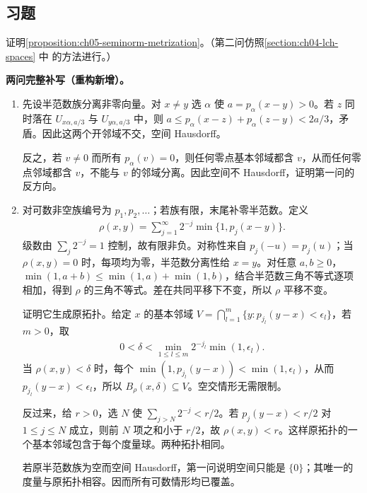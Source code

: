 \documentclass[../../main.tex]{subfiles}
\begin{document}
\subsection*{习题}
\begin{exercise}\label{exercise:ch05-prove-seminorm-metrization}
证明\cref{proposition:ch05-seminorm-metrization}。（第二问仿照\cref{section:ch04-lch-spaces} 中 的方法进行。）
\end{exercise}
\begin{solution}
\textbf{两问完整补写（重构新增）。}
\begin{enumerate}
\item 先设半范数族分离非零向量。对 $x\ne y$ 选 $\alpha$ 使 $a=p_\alpha(x-y)>0$。若 $z$ 同时落在 $U_{x\alpha,a/3}$ 与 $U_{y\alpha,a/3}$ 中，则 $a\le p_\alpha(x-z)+p_\alpha(z-y)<2a/3$，矛盾。因此这两个开邻域不交，空间 Hausdorff。

反之，若 $v\ne0$ 而所有 $p_\alpha(v)=0$，则任何零点基本邻域都含 $v$，从而任何零点邻域都含 $v$，不能与 $v$ 的邻域分离。因此空间不 Hausdorff，证明第一问的反方向。
\item 对可数非空族编号为 $p_1,p_2,\ldots$；若族有限，末尾补零半范数。定义
\begin{align*}
\rho(x,y)=\sum_{j=1}^{\infty}2^{-j}\min\{1,p_j(x-y)\}.
\end{align*}
级数由 $\sum_j2^{-j}=1$ 控制，故有限非负。对称性来自 $p_j(-u)=p_j(u)$；当 $\rho(x,y)=0$ 时，每项均为零，半范数分离性给 $x=y$。对任意 $a,b\ge0$，$\min(1,a+b)\le\min(1,a)+\min(1,b)$，结合半范数三角不等式逐项相加，得到 $\rho$ 的三角不等式。差在共同平移下不变，所以 $\rho$ 平移不变。

证明它生成原拓扑。给定 $x$ 的基本邻域 $V=\bigcap_{l=1}^m\{y:p_{j_l}(y-x)<\epsilon_l\}$，若 $m>0$，取
\begin{align*}
0<\delta<\min_{1\le l\le m}2^{-j_l}\min(1,\epsilon_l).
\end{align*}
当 $\rho(x,y)<\delta$ 时，每个 $\min(1,p_{j_l}(y-x))<\min(1,\epsilon_l)$，从而 $p_{j_l}(y-x)<\epsilon_l$，所以 $B_\rho(x,\delta)\subseteq V$。空交情形无需限制。

反过来，给 $r>0$，选 $N$ 使 $\sum_{j>N}2^{-j}<r/2$。若 $p_j(y-x)<r/2$ 对 $1\le j\le N$ 成立，则前 $N$ 项之和小于 $r/2$，故 $\rho(x,y)<r$。这样原拓扑的一个基本邻域包含于每个度量球。两种拓扑相同。

若原半范数族为空而空间 Hausdorff，第一问说明空间只能是 $\{0\}$；其唯一的度量与原拓扑相容。因而所有可数情形均已覆盖。
\end{enumerate}
\end{solution}
\end{document}
